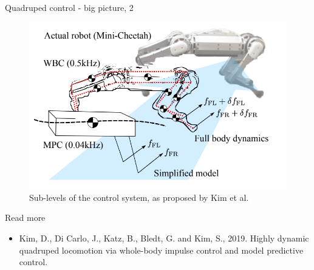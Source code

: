 \documentclass{beamer}
\begin{document}
\begin{frame}{Quadruped control - big picture, 2}
	\begin{flushleft}
		
		\begin{figure}
			\centering
			\includegraphics[width=0.8\linewidth]{ControlSystemKim_2}
			\caption{Sub-levels of the control system, as proposed by Kim et al.}
			\label{fig:controlsystemkim2}
		\end{figure}
		
		
	\end{flushleft}
\end{frame}




\begin{frame}{Read more}
	\begin{itemize}
		\item Kim, D., Di Carlo, J., Katz, B., Bledt, G. and Kim, S., 2019. Highly dynamic quadruped locomotion via whole-body impulse control and model predictive control.  
		
	\end{itemize}
\end{frame}



\myqrframe
\end{document}
